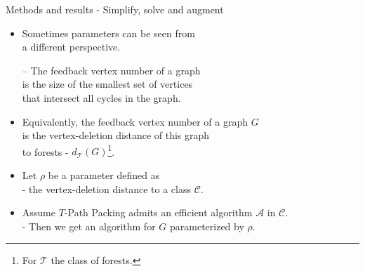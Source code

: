 \documentclass{beamer}
\begin{document}
\begin{frame}[t]{Methods and results - Simplify, solve and augment}
	\begin{itemize}
		\item Sometimes parameters can be seen from\\
			\hspace{.5cm} a different perspective.
		\item[--] The feedback vertex number of a graph\\
			\hspace{.5cm} is the size of the smallest set of vertices\\
			\hspace{.5cm} that intersect all cycles in the graph.
		\item Equivalently, the feedback vertex number of a graph $G$\\
			\hspace{.5cm} is the vertex-deletion distance of this graph\\
			\hspace{.5cm} to forests - $d_{\mathcal{T}}(G)$\footnote{For $\mathcal{T}$ the class of forests.}.
		\item Let $\rho$ be a parameter defined as \\ \hspace{.5cm} - the vertex-deletion distance to a class $\mathcal{C}$.
		\item Assume $T$-Path Packing admits an efficient algorithm $\mathcal{A}$ in $\mathcal{C}$.\\ \hspace{.5cm} - Then we get an algorithm for $G$ parameterized by $\rho$.
	\end{itemize}
\end{frame}
\end{document}
